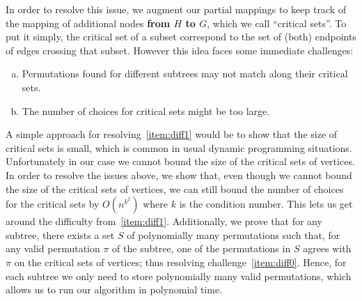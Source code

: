 In order to resolve this issue, we augment our partial mappings to
keep track of the mapping of additional nodes {\bf from $H$ to $G$},
which we call ``critical sets''. To put it simply, the critical set of
a subset correspond to the set of (both) endpoints of edges crossing
that subset. However this idea faces some immediate challenges:
%
\begin{enumerate}[(a)]
\item\label{item:diff0} Permutations found for different subtrees may
  not match along their critical sets.
\item\label{item:diff1} The number of choices for critical sets might be
  too large.
\end{enumerate}
%
A simple approach for resolving~\eqref{item:diff1} would be to show
that the size of critical sets is small, which is common in usual
dynamic programming situations. Unfortunately in our case we cannot
bound the size of the critical sets of vertices. In order to resolve
the issues above, we show that, even though we cannot bound the size
of the critical sets of vertices, we can still bound the number of
choices for the critical sets by $O(n^{k^2})$ where $k$ is the
condition number. This lets us get
around the difficulty from~\eqref{item:diff1}. Additionally, we prove
that for any subtree, there exists a set $S$ of polynomially many
permutations such that, for any valid permutation $\pi$ of the
subtree, one of the permutations in $S$ agrees with $\pi$ on the
critical sets of vertices; thus resolving
challenge~\eqref{item:diff0}. Hence, for each subtree we only need to
store polynomially many valid permutations, which allows us to run our
algorithm in polynomial time.



